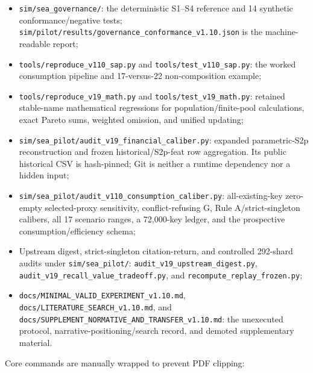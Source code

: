 \documentclass[
  11pt]{article}
\providecommand{\tightlist}{%
  \setlength{\itemsep}{0pt}\setlength{\parskip}{0pt}}
\begin{document}
\begin{itemize}
\tightlist
\item
  \texttt{sim/sea\_governance/}: the deterministic S1--S4 reference and
  14 synthetic conformance/negative tests;
  \texttt{sim/pilot/results/governance\_conformance\_v1.10.json} is the
  machine-readable report;
\item
  \texttt{tools/reproduce\_v110\_sap.py} and
  \texttt{tools/test\_v110\_sap.py}: the worked consumption pipeline and
  17-versus-22 non-composition example;
\item
  \texttt{tools/reproduce\_v19\_math.py} and
  \texttt{tools/test\_v19\_math.py}: retained stable-name mathematical
  regressions for population/finite-pool calculations, exact Pareto
  sums, weighted omission, and unified updating;
\item
  \texttt{sim/sea\_pilot/audit\_v19\_financial\_caliber.py}: expanded
  parametric-S2p reconstruction and frozen historical/S2p-feat row
  aggregation. Its public historical CSV is hash-pinned; Git is neither
  a runtime dependency nor a hidden input;
\item
  \texttt{sim/sea\_pilot/audit\_v110\_consumption\_caliber.py}:
  all-existing-key zero-empty selected-proxy sensitivity,
  conflict-refusing G, Rule A/strict-singleton calibers, all 17 scenario
  ranges, a 72,000-key ledger, and the prospective
  consumption/efficiency schema;
\item
  Upstream digest, strict-singleton citation-return, and controlled
  292-shard audits under \texttt{sim/sea\_pilot/}:
  \texttt{audit\_v19\_upstream\_digest.py},
  \texttt{audit\_v19\_recall\_value\_tradeoff.py}, and
  \texttt{recompute\_replay\_frozen.py};
\item
  \texttt{docs/MINIMAL\_VALID\_EXPERIMENT\_v1.10.md},
  \texttt{docs/LITERATURE\_SEARCH\_v1.10.md}, and
  \texttt{docs/SUPPLEMENT\_NORMATIVE\_AND\_TRANSFER\_v1.10.md}: the
  unexecuted protocol, narrative-positioning/search record, and demoted
  supplementary material.
\end{itemize}

Core commands are manually wrapped to prevent PDF clipping:
\end{document}
